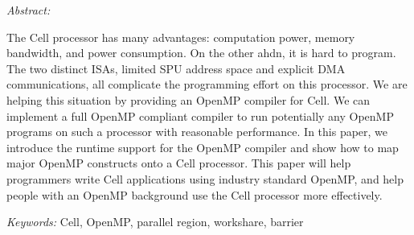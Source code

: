 
\noindent  
\emph{Abstract:} 
{

The Cell processor has many advantages: computation power, memory bandwidth,
and power consumption. On the other ahdn, it is hard to program.  The two
distinct ISAs, limited SPU address space and explicit DMA communications, all
complicate the programming effort on this processor.  We are helping this
situation by providing an OpenMP compiler for Cell.  We can implement a full
OpenMP compliant compiler to run potentially any OpenMP programs on such a
processor with reasonable performance. In this paper, we introduce the runtime
support for the OpenMP compiler and show how to map major OpenMP constructs
onto a Cell processor. This paper will help programmers write Cell applications
using industry standard OpenMP, and help people with an OpenMP background use
the Cell processor more effectively.  

}

\vspace{0.5cm}

\noindent
\emph{Keywords:} {\small Cell, OpenMP, parallel region, workshare, barrier}

